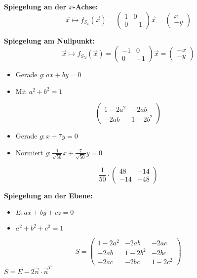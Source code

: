 \textbf{Spiegelung an der $x$-Achse:}
\[\vec{x} \mapsto f_{S_x}(\vec{x}) = \left(
\begin{array}{cc}
    1 & 0 \\ 0 & -1
\end{array}
\right) \vec{x} = \left(
\begin{array}{c}
    x \\ -y
\end{array}
\right)\]

\textbf{Spiegelung am Nullpunkt:}
\[\vec{x} \mapsto f_{S_N}(\vec{x}) = \left(
\begin{array}{cc}
    -1 & 0 \\ 0 & -1
\end{array}
\right) \vec{x} = \left(
\begin{array}{c}
    -x \\ -y
\end{array}
\right)\]

\hrulefill

\begin{multicols}{2}
    \begin{itemize}
        \item Gerade $g: ax + by = 0$
        \item Mit $a^2 + b^2 = 1$
    \end{itemize}
    \[\left(
    \begin{array}{cc}
        1 - 2a^2 & -2ab \\ -2ab & 1 - 2b^2
    \end{array}
    \right)\]
\end{multicols}

\hrulefill

\begin{multicols}{2}
    \raggedright
    \begin{itemize}
        \item Gerade $g: x + 7y = 0$
        \item Normiert $g: \frac{1}{\sqrt{50}}x + \frac{7}{\sqrt{50}}y = 0$
    \end{itemize}
    \[\frac{1}{50} \cdot \left(
    \begin{array}{cc}
        48 & -14 \\ -14 & -48
    \end{array}
    \right)\]
\end{multicols}

\hrulefill

\textbf{Spiegelung an der Ebene:}
\begin{itemize}
    \item $E: ax + by + cz = 0$
    \item $a^2 + b^2 + c^2 = 1$
\end{itemize}
\[S = \left(
\begin{array}{ccc}
    1-2a^2 & -2ab   & -2ac   \\
    -2ab   & 1-2b^2 & -2bc   \\
    -2ac   & -2bc   & 1-2c^2
\end{array}
\right)\]
$S = E - 2 \vec{n} \cdot \vec{n}^T$

